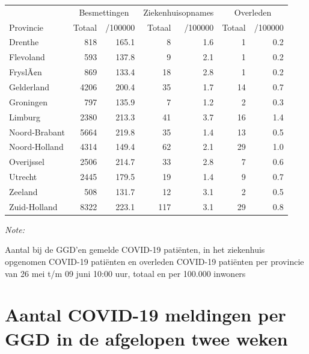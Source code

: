 \documentclass[
  english,
  man,floatsintext]{apa6}
\begin{document}
\begin{table}
\centering
\begin{threeparttable}
\begin{tabular}{lrrrrrr}
\toprule
\multicolumn{1}{c}{ } & \multicolumn{2}{c}{Besmettingen} & \multicolumn{2}{c}{Ziekenhuisopnames} & \multicolumn{2}{c}{Overleden} \\
\cmidrule(l{3pt}r{3pt}){2-3} \cmidrule(l{3pt}r{3pt}){4-5} \cmidrule(l{3pt}r{3pt}){6-7}
Provincie & Totaal & /100000 & Totaal & /100000 & Totaal & /100000\\
\midrule
Drenthe & 818 & 165.1 & 8 & 1.6 & 1 & 0.2\\
Flevoland & 593 & 137.8 & 9 & 2.1 & 1 & 0.2\\
FryslÃ¢n & 869 & 133.4 & 18 & 2.8 & 1 & 0.2\\
Gelderland & 4206 & 200.4 & 35 & 1.7 & 14 & 0.7\\
Groningen & 797 & 135.9 & 7 & 1.2 & 2 & 0.3\\
Limburg & 2380 & 213.3 & 41 & 3.7 & 16 & 1.4\\
Noord-Brabant & 5664 & 219.8 & 35 & 1.4 & 13 & 0.5\\
Noord-Holland & 4314 & 149.4 & 62 & 2.1 & 29 & 1.0\\
Overijssel & 2506 & 214.7 & 33 & 2.8 & 7 & 0.6\\
Utrecht & 2445 & 179.5 & 19 & 1.4 & 9 & 0.7\\
Zeeland & 508 & 131.7 & 12 & 3.1 & 2 & 0.5\\
Zuid-Holland & 8322 & 223.1 & 117 & 3.1 & 29 & 0.8\\
\bottomrule
\end{tabular}
\begin{tablenotes}
\item \textit{Note: } 
\item Aantal bij de GGD’en gemelde COVID-19 patiënten, in het ziekenhuis opgenomen COVID-19 patiënten en overleden COVID-19 patiënten per provincie van 26 mei t/m 09 juni 10:00 uur, totaal en per 100.000 inwoners
\end{tablenotes}
\end{threeparttable}
\end{table}

\newpage

\hypertarget{aantal-covid-19-meldingen-per-ggd-in-de-afgelopen-twee-weken}{%
\section{Aantal COVID-19 meldingen per GGD in de afgelopen twee weken}\label{aantal-covid-19-meldingen-per-ggd-in-de-afgelopen-twee-weken}}
\end{document}
